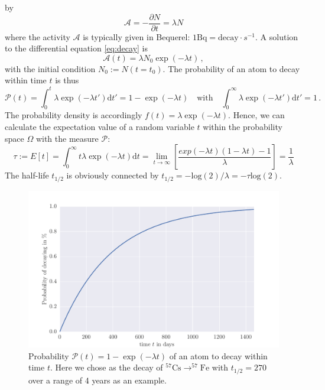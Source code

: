 by 
\begin{equation}\label{eq:decay}
    \mathcal{A} = -\frac{\partial N}{\partial t} = \lambda N 
\end{equation}
where the activity $\mathcal{A}$ is typically given in Bequerel: $1 \textrm{Bq}= \textrm{decay}\cdot s^{-1}$.
A solution to the differential equation \eqref{eq:decay} is
\begin{equation}
    \mathcal{A}(t) = \lambda N_0 \exp(-\lambda t) \, ,
\end{equation}
with the initial condition $N_0 := N(t=t_0)$. 
The probability of an atom to decay within time $t$ is thus
\begin{equation}
    \mathcal{P}(t) = \int_{0}^{t}\lambda \exp(-\lambda t')\mathrm{d}t' = 1 -  \exp(-\lambda t)  \quad
    \textrm{with} \quad \int_{0}^{\infty}\lambda \exp(-\lambda t')\mathrm{d}t' = 1 \, .
\end{equation}
The probability density is accordingly $f(t) = \lambda \exp(-\lambda t)$. 
Hence, we can calculate the expectation value of a random variable $t$ within the probability space
$\Omega$ with the measure  $\mathcal{P}$:
\begin{equation}
    \tau := E[t] = \int_{0}^{\infty} t \lambda \exp(-\lambda t) \mathrm{d}t 
    =\lim_{t \rightarrow \infty}\left[ \frac{exp(-\lambda t) (1-\lambda t) - 1 }{\lambda} \right] 
= \frac{1}{\lambda}
\end{equation}
The half-life $t_{1/2}$ is obviously connected by $t_{1/2}= -\mathrm{log}(2)/ \lambda = - \tau \mathrm{log}(2)$.
\begin{figure}[htpb]
    \centering
    \includegraphics[width=0.9\linewidth]{analysis/figures/halflife}
    \caption{Probability $\mathcal{P}(t) = 1 -  \exp(-\lambda t)$ of an atom to decay within time $t$.
        Here we chose as the decay of
        $^{57}\textrm{Cs}\rightarrow ^{57}\textrm{Fe}$ with $t_{1/2}=270$ over a range
    of 4 years as an example.}
    \label{fig:decay}
\end{figure}
\clearpage
